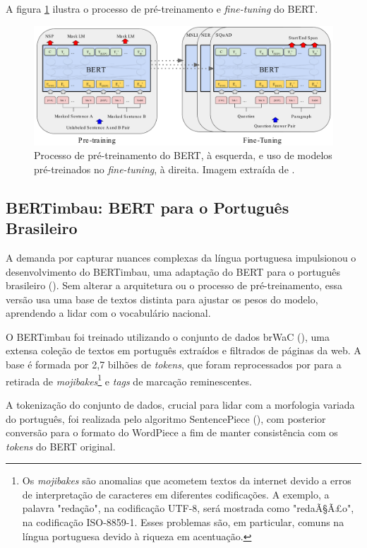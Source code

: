 A figura \ref{fig:bert_training_tuning} ilustra o processo de pré-treinamento e \textit{fine-tuning} do BERT.

\begin{figure}[H]
    \centering
    \caption{Processo de pré-treinamento do BERT, à esquerda, e uso de modelos pré-treinados no \textit{fine-tuning}, à direita. Imagem extraída de \cite{bert2018}.}
    \label{fig:bert_training_tuning}
    \includegraphics[width=\textwidth]{../figuras/bert_training_tuning}
\end{figure}

\subsection{BERTimbau: BERT para o Português Brasileiro}

A demanda por capturar nuances complexas da língua portuguesa impulsionou o desenvolvimento do BERTimbau, uma adaptação do BERT para o português brasileiro (\cite{bertimbau2020}). Sem alterar a arquitetura ou o processo de pré-treinamento, essa versão usa uma base de textos distinta para ajustar os pesos do modelo, aprendendo a lidar com o vocabulário nacional.

O BERTimbau foi treinado utilizando o conjunto de dados brWaC (\cite{filho-etal-2018-brwac}), uma extensa coleção de textos em português extraídos e filtrados de páginas da web. A base é formada por 2,7 bilhões de \textit{tokens}, que foram reprocessados por \citet{bertimbau2020} para a retirada de \textit{mojibakes}\footnote{Os \textit{mojibakes} são anomalias que acometem textos da internet devido a erros de interpretação de caracteres em diferentes codificações. A exemplo, a palavra "redação", na codificação UTF-8, será mostrada como "redaÃ§Ã£o", na codificação ISO-8859-1. Esses problemas são, em particular, comuns na língua portuguesa devido à riqueza em acentuação.} e \textit{tags} de marcação reminescentes.

A tokenização do conjunto de dados, crucial para lidar com a morfologia variada do português, foi realizada pelo algoritmo SentencePiece (\cite{kudo2018sentencepiece}), com posterior conversão para o formato do WordPiece a fim de manter consistência com os \textit{tokens} do BERT original.


